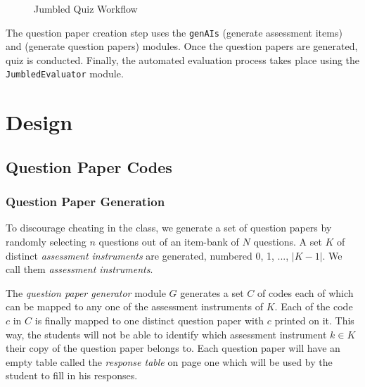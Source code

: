 \documentclass[12pt]{report}
\begin{document}
\begin{figure}[H]
\begin{center}
{
}
\end{center}
\caption{Jumbled Quiz Workflow}
\label{f:jquiz}
\end{figure}
The question paper creation step uses the \lstinline[style=pc]@genAIs@ (generate assessment items) and \lstinline@genQPs@ (generate question papers) modules. Once the question papers are generated, quiz is conducted. Finally, the automated evaluation process takes place using the \lstinline[style=pc]@JumbledEvaluator@ module.

\chapter{Design}
\section{Question Paper Codes}

\subsection{Question Paper Generation}
To discourage cheating in the class, we generate a set of question papers by randomly selecting $n$ questions out of an item-bank of $N$ questions. A set $K$ of distinct \emph{assessment instruments} are generated, numbered 0, 1, ..., $|K-1|$. We call them \emph{assessment instruments}.

The \emph{question paper generator} module $G$ generates a set $C$ of codes each of which can be mapped to any one of the assessment instruments of $K$. Each of the code $c$ in $C$ is finally mapped to one distinct question paper with $c$ printed on it. This way, the students will not be able to identify which assessment instrument $k \in K$ their copy of the question paper belongs to. Each question paper will have an empty table called the \emph{response table} on page one which will be used by the student to fill in his responses.
\end{document}

